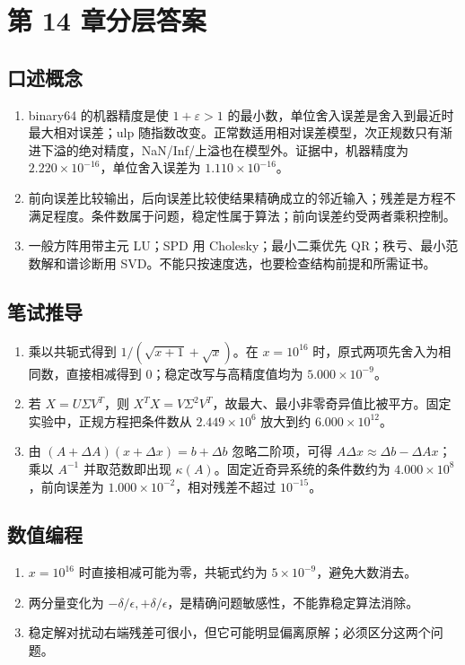 \chapter{第 14 章分层答案}
\label{app:ch14-solutions}

\section*{口述概念}
\begin{enumerate}[nosep,leftmargin=*]
\item binary64 的机器精度是使 $1+\varepsilon>1$ 的最小数，单位舍入误差是舍入到最近时最大相对误差；ulp 随指数改变。正常数适用相对误差模型，次正规数只有渐进下溢的绝对精度，NaN/Inf/上溢也在模型外。证据中，机器精度为 $2.220\times10^{-16}$，单位舍入误差为 $1.110\times10^{-16}$。
\item 前向误差比较输出，后向误差比较使结果精确成立的邻近输入；残差是方程不满足程度。条件数属于问题，稳定性属于算法；前向误差约受两者乘积控制。
\item 一般方阵用带主元 LU；SPD 用 Cholesky；最小二乘优先 QR；秩亏、最小范数解和谱诊断用 SVD。不能只按速度选，也要检查结构前提和所需证书。
\end{enumerate}

\section*{笔试推导}
\begin{enumerate}[nosep,leftmargin=*,start=4]
\item 乘以共轭式得到 $1/(\sqrt{x+1}+\sqrt{x})$。在 $x=10^{16}$ 时，原式两项先舍入为相同数，直接相减得到 $0$；稳定改写与高精度值均为 $5.000\times10^{-9}$。
\item 若 $X=U\Sigma V^T$，则 $X^TX=V\Sigma^2V^T$，故最大、最小非零奇异值比被平方。固定实验中，正规方程把条件数从 $2.449\times10^6$ 放大到约 $6.000\times10^{12}$。
\item 由 $(A+\Delta A)(x+\Delta x)=b+\Delta b$ 忽略二阶项，可得 $A\Delta x\approx\Delta b-\Delta A x$；乘以 $A^{-1}$ 并取范数即出现 $\kappa(A)$。固定近奇异系统的条件数约为 $4.000\times10^8$，前向误差为 $1.000\times10^{-2}$，相对残差不超过 $10^{-15}$。
\end{enumerate}

\section*{数值编程}
\begin{enumerate}[leftmargin=*]
  \item $x=10^{16}$ 时直接相减可能为零，共轭式约为 $5\times10^{-9}$，避免大数消去。
  \item 两分量变化为 $-\delta/\epsilon,+\delta/\epsilon$，是精确问题敏感性，不能靠稳定算法消除。
  \item 稳定解对扰动右端残差可很小，但它可能明显偏离原解；必须区分这两个问题。
\end{enumerate}

